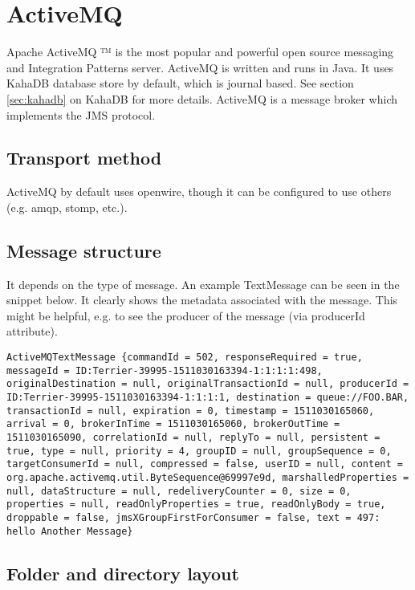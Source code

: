 \section{ActiveMQ}
Apache ActiveMQ ™ is the most popular and powerful open source messaging and Integration Patterns server. ActiveMQ is written and runs in Java. It uses KahaDB database store by default, which is journal based. See section \ref{sec:kahadb} on KahaDB for more details.
ActiveMQ is a message broker which implements the JMS protocol.

  \subsection{Transport method}
  ActiveMQ by default uses openwire, though it can be configured to use others (e.g. amqp, stomp, etc.).

  \subsection{Message structure}
  It depends on the type of message. An example TextMessage can be seen in the snippet below. It clearly shows the metadata associated with the message. This might be helpful, e.g. to see the producer of the message (via producerId attribute).

  \begin{lstlisting}[caption={Example ActiveMQ TextMessage}]
  ActiveMQTextMessage {commandId = 502, responseRequired = true, messageId = ID:Terrier-39995-1511030163394-1:1:1:1:498, originalDestination = null, originalTransactionId = null, producerId = ID:Terrier-39995-1511030163394-1:1:1:1, destination = queue://FOO.BAR, transactionId = null, expiration = 0, timestamp = 1511030165060, arrival = 0, brokerInTime = 1511030165060, brokerOutTime = 1511030165090, correlationId = null, replyTo = null, persistent = true, type = null, priority = 4, groupID = null, groupSequence = 0, targetConsumerId = null, compressed = false, userID = null, content = org.apache.activemq.util.ByteSequence@69997e9d, marshalledProperties = null, dataStructure = null, redeliveryCounter = 0, size = 0, properties = null, readOnlyProperties = true, readOnlyBody = true, droppable = false, jmsXGroupFirstForConsumer = false, text = 497: hello Another Message}
  \end{lstlisting}

  \subsection{Folder and directory layout}
